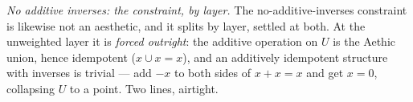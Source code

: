 \textit{No additive inverses: the constraint, by layer.} The no-additive-inverses constraint is likewise not an aesthetic, and it splits by layer, settled at both. At the unweighted layer it is \emph{forced outright}: the additive operation on $U$ is the Aethic union, hence idempotent ($x \cup x = x$), and an additively idempotent structure with inverses is trivial --- add $-x$ to both sides of $x + x = x$ and get $x = 0$, collapsing $U$ to a point. Two lines, airtight.

